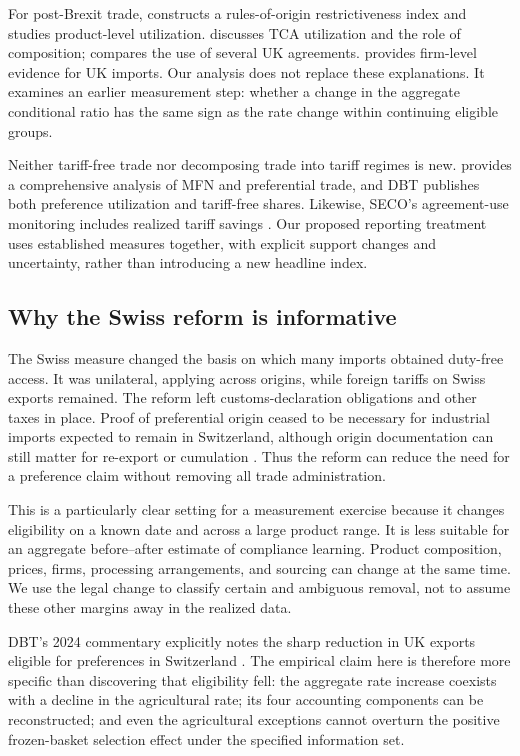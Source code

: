 \documentclass[11pt,a4paper]{article}
\begin{document}
For post-Brexit trade, \citet{ayele2023} constructs a rules-of-origin restrictiveness index and studies product-level utilization. \citet{tamberi2022} discusses TCA utilization and the role of composition; \citet{brenis2024} compares the use of several UK agreements. \citet{ons2025} provides firm-level evidence for UK imports. Our analysis does not replace these explanations. It examines an earlier measurement step: whether a change in the aggregate conditional ratio has the same sign as the rate change within continuing eligible groups.

Neither tariff-free trade nor decomposing trade into tariff regimes is new. \citet{gonciarz2025} provides a comprehensive analysis of MFN and preferential trade, and DBT publishes both preference utilization and tariff-free shares. Likewise, SECO's agreement-use monitoring includes realized tariff savings \citep{secomonitor2026}. Our proposed reporting treatment uses established measures together, with explicit support changes and uncertainty, rather than introducing a new headline index.

\subsection{Why the Swiss reform is informative}
The Swiss measure changed the basis on which many imports obtained duty-free access. It was unilateral, applying across origins, while foreign tariffs on Swiss exports remained. The reform left customs-declaration obligations and other taxes in place. Proof of preferential origin ceased to be necessary for industrial imports expected to remain in Switzerland, although origin documentation can still matter for re-export or cumulation \citep{seco2026}. Thus the reform can reduce the need for a preference claim without removing all trade administration.

This is a particularly clear setting for a measurement exercise because it changes eligibility on a known date and across a large product range. It is less suitable for an aggregate before--after estimate of compliance learning. Product composition, prices, firms, processing arrangements, and sourcing can change at the same time. We use the legal change to classify certain and ambiguous removal, not to assume these other margins away in the realized data.

DBT's 2024 commentary explicitly notes the sharp reduction in UK exports eligible for preferences in Switzerland \citep{dbt2026b}. The empirical claim here is therefore more specific than discovering that eligibility fell: the aggregate rate increase coexists with a decline in the agricultural rate; its four accounting components can be reconstructed; and even the agricultural exceptions cannot overturn the positive frozen-basket selection effect under the specified information set.
\end{document}
